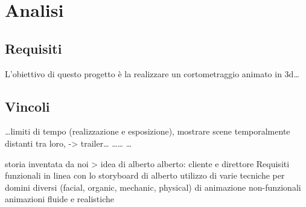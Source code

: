 
\chapter{Analisi} %

\label{Chapter2} %

\section{Requisiti}
L'obiettivo di questo progetto è la realizzare un cortometraggio animato in 3d\ldots


\section{Vincoli}
\ldots limiti di tempo (realizzazione e esposizione), mostrare scene temporalmente distanti tra loro, -> trailer\ldots
\ldots \ldots
\ldots

storia inventata da noi > idea di alberto
alberto: cliente e direttore
 Requisiti
 funzionali
in linea con lo storyboard di alberto
utilizzo di varie tecniche per domini diversi (facial, organic, mechanic, physical) di animazione
 non-funzionali
animazioni fluide e realistiche